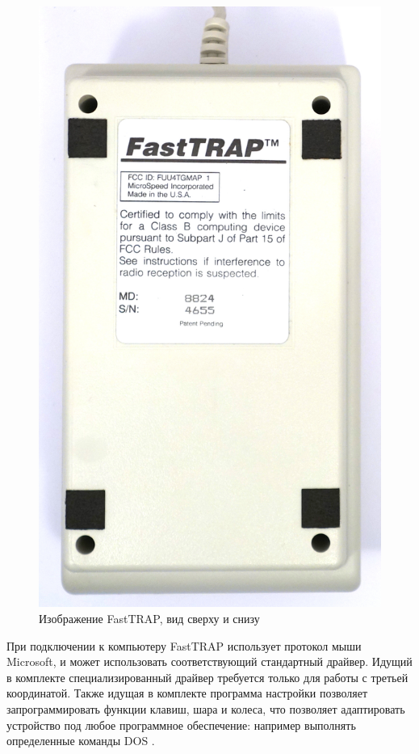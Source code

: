 \documentclass[11pt, a4paper]{article}
\begin{document}
\begin{figure}[h]
    \includegraphics[scale=0.3]{1987_microspeed_fasttrap/bottom_60.jpg}
    \caption{Изображение FastTRAP, вид сверху и снизу}
    \label{fig:FastTRAPTop}
\end{figure}

При подключении к компьютеру FastTRAP использует протокол мыши Microsoft, и может использовать соответствующий стандартный драйвер. Идущий в комплекте специализированный драйвер требуется только для работы с третьей координатой. Также идущая в комплекте программа настройки позволяет запрограммировать функции клавиш, шара и колеса, что позволяет адаптировать устройство под любое программное обеспечение: например выполнять определенные команды DOS \cite{fast}.
\end{document}

